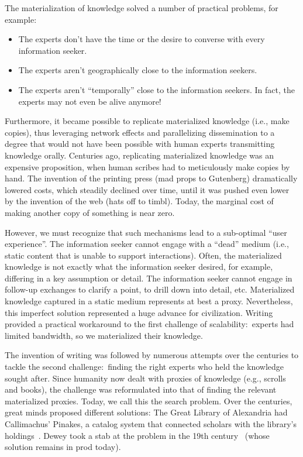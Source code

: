 \documentclass{article}
\begin{document}
The materialization of knowledge solved a number of practical problems, for example:

\begin{itemize}

\item The experts don't have the time or the desire to converse with every information seeker.

\item The experts aren't geographically close to the information seekers.

\item The experts aren't ``temporally'' close to the information seekers.
In fact, the experts may not even be alive anymore!

\end{itemize}

Furthermore, it became possible to replicate materialized knowledge (i.e., make copies), thus leveraging network effects and parallelizing dissemination to a degree that would not have been possible with human experts transmitting knowledge orally.
Centuries ago, replicating materialized knowledge was an expensive proposition, when human scribes had to meticulously make copies by hand.
The invention of the printing press (mad props to Gutenberg) dramatically lowered costs, which steadily declined over time, until it was pushed even lower by the invention of the web (hats off to timbl).
Today, the marginal cost of making another copy of something is near zero.

However, we must recognize that such mechanisms lead to a sub-optimal ``user experience''.
The information seeker cannot engage with a ``dead'' medium (i.e., static content that is unable to support interactions).
Often, the materialized knowledge is not exactly what the information seeker desired, for example, differing in a key assumption or detail.
The information seeker cannot engage in follow-up exchanges to clarify a point, to drill down into detail, etc.
Materialized knowledge captured in a static medium represents at best a proxy.
Nevertheless, this imperfect solution represented a huge advance for civilization.
Writing provided a practical workaround to the first challenge of scalability:\ experts had limited bandwidth, so we materialized their knowledge.

The invention of writing was followed by numerous attempts over the centuries to tackle the second challenge:\ finding the right experts who held the knowledge sought after.
Since humanity now dealt with proxies of knowledge (e.g., scrolls and books), the challenge was reformulated into that of finding the relevant materialized proxies.
Today, we call this the search problem.
Over the centuries, great minds proposed different solutions:
The Great Library of Alexandria had Callimachus' Pinakes, a catalog system that connected scholars with the library's holdings~\citep{El-Abbadi_1990}.
Dewey took a stab at the problem in the 19th century~\citep{dewey} (whose solution remains in prod today).
\end{document}

